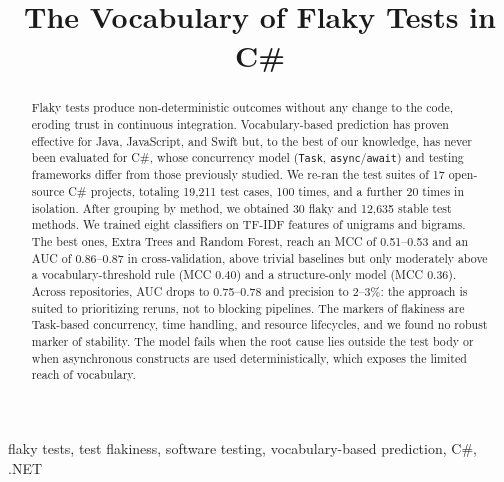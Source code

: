 \documentclass[10pt,conference]{IEEEtran}
\begin{document}
\title{The Vocabulary of Flaky Tests in C\#}

\author{
}

\maketitle

\begin{abstract}
Flaky tests produce non-deterministic outcomes without any change to the code, eroding trust in continuous integration. Vocabulary-based prediction has proven effective for Java, JavaScript, and Swift but, to the best of our knowledge, has never been evaluated for C\#, whose concurrency model (\texttt{Task}, \texttt{async}/\texttt{await}) and testing frameworks differ from those previously studied. We re-ran the test suites of 17 open-source C\# projects, totaling 19,211 test cases, 100 times, and a further 20 times in isolation. After grouping by method, we obtained 30 flaky and 12,635 stable test methods. We trained eight classifiers on TF-IDF features of unigrams and bigrams. The best ones, Extra Trees and Random Forest, reach an MCC of 0.51--0.53 and an AUC of 0.86--0.87 in cross-validation, above trivial baselines but only moderately above a vocabulary-threshold rule (MCC 0.40) and a structure-only model (MCC 0.36). Across repositories, AUC drops to 0.75--0.78 and precision to 2--3\%: the approach is suited to prioritizing reruns, not to blocking pipelines. The markers of flakiness are Task-based concurrency, time handling, and resource lifecycles, and we found no robust marker of stability. The model fails when the root cause lies outside the test body or when asynchronous constructs are used deterministically, which exposes the limited reach of vocabulary.
\end{abstract}

\begin{IEEEkeywords}
flaky tests, test flakiness, software testing, vocabulary-based prediction, C\#, .NET
\end{IEEEkeywords}










\end{document}
